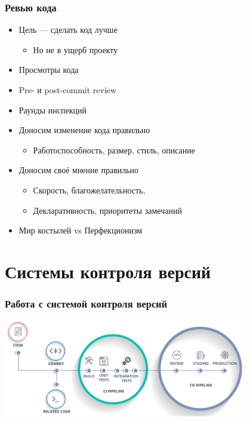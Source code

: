 \documentclass{../../slides-style}
\begin{document}
    \begin{frame}
        \frametitle{Ревью кода}
        \begin{itemize}
            \item Цель --- сделать код лучше
            \begin{itemize}
                \item Но не в ущерб проекту
            \end{itemize}
            \item Просмотры кода
            \item Pre- и post-commit review
            \item Раунды инспекций
            \item Доносим изменение кода правильно
            \begin{itemize}
                \item Работоспособность, размер, стиль, описание
            \end{itemize}
            \item Доносим своё мнение правильно
            \begin{itemize}
                \item Скорость, благожелательность, 
                \item Декларативность, приоритеты замечаний
            \end{itemize}
            \item Мир костылей vs Перфекционизм
        \end{itemize}
    \end{frame}

    \section{Системы контроля версий}

    \begin{frame}
        \frametitle{Работа с системой контроля версий}
        \begin{center}
            \includegraphics[width=0.8\textwidth]{vcsPipeline.png}
        \end{center}
    \end{frame}
\end{document}
